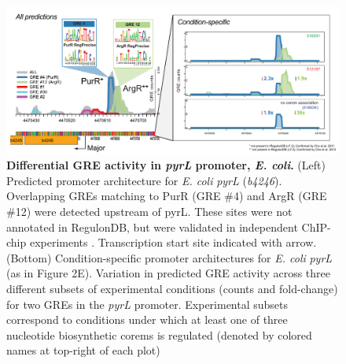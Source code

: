 \begin{figure}[hp]
\centering
\includegraphics[width=0.95\linewidth]{figures/pyrL.pdf}
\caption[Differential GRE activity in \textit{pyrL} promoter, \textit{E. coli}]{\textbf{Differential GRE activity in \textit{pyrL} promoter, \textit{E. coli}.} (Left) Predicted promoter architecture for {\it E. coli} \textit{pyrL} (\textit{b4246}). Overlapping GREs matching to PurR (GRE \#4) and ArgR (GRE \#12) were detected upstream of pyrL. These sites were not annotated in RegulonDB, but were validated in independent ChIP-chip experiments \cite{Cho2012,Cho2011a}. Transcription start site indicated with arrow. (Bottom) Condition-specific promoter architectures for {\it E. coli} \textit{pyrL} (as in Figure 2E). Variation in predicted GRE activity across three different subsets of experimental conditions (counts and fold-change) for two GREs in the \textit{pyrL} promoter. Experimental subsets correspond to conditions under which at least one of three nucleotide biosynthetic corems is regulated (denoted by colored names at top-right of each plot)}
\label{fig:pyrL}
\end{figure}


